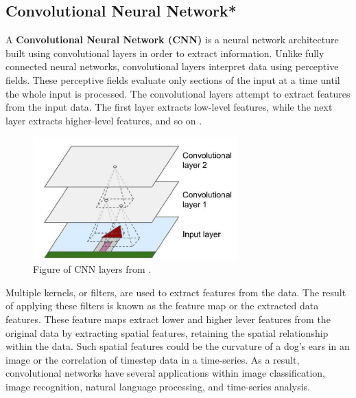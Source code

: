 \subsection{Convolutional Neural Network*}
\label{section:BT:CNN}
A \textbf{Convolutional Neural Network (CNN)} is a neural network architecture built using convolutional layers in order to extract information.
Unlike fully connected neural networks, convolutional layers interpret data using perceptive fields.
These perceptive fields evaluate only sections of the input at a time until the whole input is processed.
The convolutional layers attempt to extract features from the input data.
The first layer extracts low-level features, while the next layer extracts higher-level features, and so on
\cite[p.~443-446]{Geron2017}.


\begin{figure}[h!]
  \centering
  \includegraphics[width=0.7\textwidth]{./sections/BT/figures/convolution_hands_one_machine_learning.png}
  \hfill
  \caption{Figure of CNN layers from \cite[p.~444]{Geron2017}.}
  \label{fig:convolution}
\end{figure}


Multiple kernels, or filters, are used to extract features from the data.
The result of applying these filters is known as the feature map or the extracted data features.
These feature maps extract lower and higher lever features from the original data by
extracting spatial features, retaining the spatial relationship within the data.
Such spatial features could be the curvature of a dog's ears in an image or the correlation of timestep data in a time-series.
As a result, convolutional networks have several applications within image classification,
image recognition, natural language processing, and time-series analysis.



